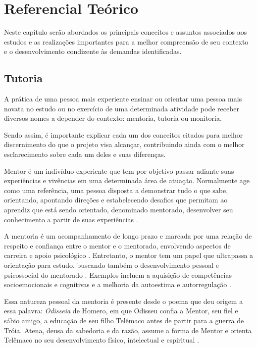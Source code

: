 \chapter[Referencial Teórico]{Referencial Teórico}
\label{cap:referencial}

Neste capítulo serão abordados os principais conceitos e assuntos associados aos estudos e as realizações importantes para a melhor compreensão de seu contexto e o desenvolvimento condizente às demandas identificadas.

\section[Tutoria]{Tutoria}
\label{sec:tutoria}

A prática de uma pessoa mais experiente ensinar ou orientar uma pessoa mais novata no estudo ou no exercício de uma determinada atividade pode receber diversos nomes a depender do contexto: mentoria, tutoria ou monitoria.

Sendo assim, é importante explicar cada um dos conceitos citados para melhor discernimento do que o projeto visa alcançar, contribuindo ainda com o melhor esclarecimento sobre cada um deles e suas diferenças.

Mentor é um indivíduo experiente que tem por objetivo passar adiante suas experiências e vivências em uma determinada área de atuação. Normalmente age como uma referência, uma pessoa disposta a demonstrar tudo o que sabe, orientando, apontando direções e estabelecendo desafios que permitam ao aprendiz que está sendo orientado, denominado mentorado, desenvolver seu conhecimento a partir de suas experiências \cite{oliveira2020mentoria}.

A mentoria é um acompanhamento de longo prazo e marcada por uma relação de respeito e confiança entre o mentor e o mentorado, envolvendo aspectos de carreira e apoio psicológico \cite{oliveira2020mentoria}. Entretanto, o mentor tem um papel que ultrapassa a orientação para estudo, buscando também o desenvolvimento pessoal e psicossocial do mentorado \cite{botti2008preceptor}. Exemplos incluem a aquisição de competências socioemocionais e cognitivas e a melhoria da autoestima e autorregulação \cite{opp2024mentoria}.

Essa natureza pessoal da mentoria é presente desde o poema que deu origem a essa palavra: \textit{Odisseia} de Homero, em que Odisseu confia a Mentor, seu fiel e sábio amigo, a educação de seu filho Telêmaco antes de partir para a guerra de Tróia. Atena, deusa da sabedoria e da razão, assume a forma de Mentor e orienta Telêmaco no seu desenvolvimento físico, intelectual e espiritual \cite{semiao2009tutoria}.

